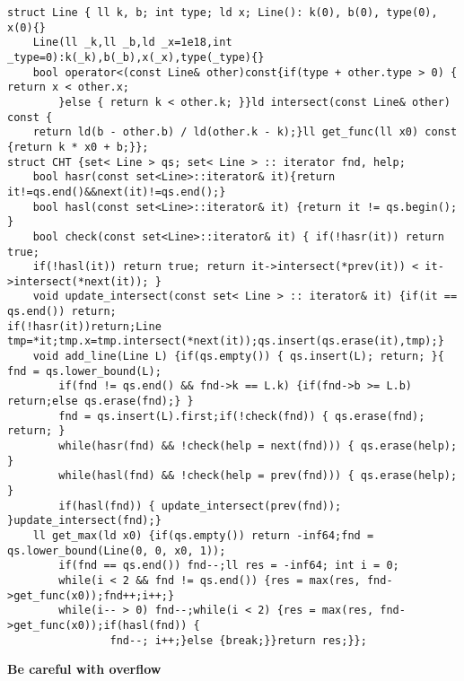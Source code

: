 \documentclass[12pt]{article}
\begin{document}
\begin{verbatim}
struct Line { ll k, b; int type; ld x; Line(): k(0), b(0), type(0), x(0){}
    Line(ll _k,ll _b,ld _x=1e18,int _type=0):k(_k),b(_b),x(_x),type(_type){}
    bool operator<(const Line& other)const{if(type + other.type > 0) { return x < other.x;
        }else { return k < other.k; }}ld intersect(const Line& other) const {
    return ld(b - other.b) / ld(other.k - k);}ll get_func(ll x0) const {return k * x0 + b;}};
struct CHT {set< Line > qs; set< Line > :: iterator fnd, help;
    bool hasr(const set<Line>::iterator& it){return it!=qs.end()&&next(it)!=qs.end();}
    bool hasl(const set<Line>::iterator& it) {return it != qs.begin(); }
    bool check(const set<Line>::iterator& it) { if(!hasr(it)) return true;
    if(!hasl(it)) return true; return it->intersect(*prev(it)) < it->intersect(*next(it)); }
    void update_intersect(const set< Line > :: iterator& it) {if(it == qs.end()) return;
if(!hasr(it))return;Line tmp=*it;tmp.x=tmp.intersect(*next(it));qs.insert(qs.erase(it),tmp);}
    void add_line(Line L) {if(qs.empty()) { qs.insert(L); return; }{   fnd = qs.lower_bound(L);
        if(fnd != qs.end() && fnd->k == L.k) {if(fnd->b >= L.b) return;else qs.erase(fnd);} }
        fnd = qs.insert(L).first;if(!check(fnd)) { qs.erase(fnd); return; }
        while(hasr(fnd) && !check(help = next(fnd))) { qs.erase(help); }
        while(hasl(fnd) && !check(help = prev(fnd))) { qs.erase(help); }
        if(hasl(fnd)) { update_intersect(prev(fnd)); }update_intersect(fnd);}
    ll get_max(ld x0) {if(qs.empty()) return -inf64;fnd = qs.lower_bound(Line(0, 0, x0, 1));
        if(fnd == qs.end()) fnd--;ll res = -inf64; int i = 0;
        while(i < 2 && fnd != qs.end()) {res = max(res, fnd->get_func(x0));fnd++;i++;}
        while(i-- > 0) fnd--;while(i < 2) {res = max(res, fnd->get_func(x0));if(hasl(fnd)) {
                fnd--; i++;}else {break;}}return res;}};
\end{verbatim}

{\bf Be careful with overflow}
\end{document}
